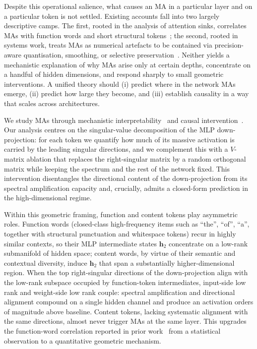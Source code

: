 \documentclass{article}
\begin{document}
Despite this operational salience, what causes an MA in a particular
layer and on a particular token is not settled. Existing accounts fall into
two largely descriptive camps. The first, rooted in the analysis of
attention sinks, correlates MAs with function words and short
structural tokens~\citep{xiao2024efficient,cancedda2024spectral,gu2025attention};
the second, rooted in systems work, treats MAs as numerical artefacts to be
contained via precision-aware quantisation, smoothing, or selective
preservation~\citep{dettmers2022gpt3,xiao2023smoothquant,bondarenko2023quantizable,liu2024intactkv}.
Neither yields a mechanistic explanation of why MAs arise only at
certain depths, concentrate on a handful of hidden dimensions, and respond
sharply to small geometric interventions. A unified theory should (i) predict
where in the network MAs emerge, (ii) predict how large they
become, and (iii) establish causality in a way that scales across
architectures.

We study MAs through mechanistic
interpretability~\citep{elhage2021mathematical,conmy2023towards} and
causal intervention~\citep{pearl2009causality,meng2022locating}. Our
analysis centres on the singular-value decomposition of the MLP
down-projection: for each token we quantify how much of its massive
activation is carried by the leading singular directions, and we
complement this with a $V$-matrix ablation that replaces the
right-singular matrix by a random orthogonal matrix while keeping the
spectrum and the rest of the network fixed. This intervention
disentangles the directional content of the down-projection
from its spectral amplification capacity and, crucially, admits
a closed-form prediction in the high-dimensional regime.

Within this geometric framing, function and content tokens play
asymmetric roles. Function words (closed-class high-frequency items
such as ``the'', ``of'', ``a'', together with structural punctuation
and whitespace tokens) recur in highly similar contexts, so their MLP
intermediate states $\mathbf{h}_2$ concentrate on a low-rank
submanifold of hidden space; content words, by virtue of their
semantic and contextual diversity, induce $\mathbf{h}_2$ that span a
substantially higher-dimensional region. When the top right-singular
directions of the down-projection align with the low-rank subspace
occupied by function-token intermediates, input-side low rank
and weight-side low rank couple: spectral amplification and
directional alignment compound on a single hidden channel and produce
an activation orders of magnitude above baseline. Content tokens,
lacking systematic alignment with the same directions, almost never
trigger MAs at the same layer. This upgrades the function-word
correlation reported in prior
work~\citep{sun2024massive,xiao2024efficient} from a statistical
observation to a quantitative geometric mechanism.
\end{document}
